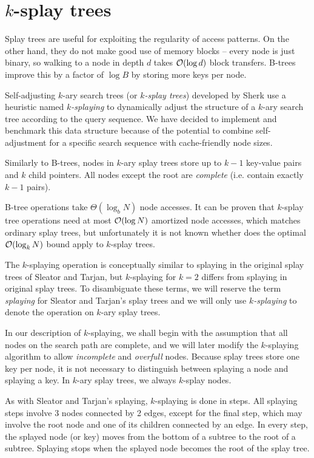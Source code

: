 \chapter{$k$-splay trees}
Splay trees are useful for exploiting the regularity of access patterns.
On the other hand, they do not make good use of memory blocks -- every node
is just binary, so walking to a node in depth $d$ takes $\mathcal{O}(\log d)$ block
transfers. B-trees improve this by a factor of $\log B$ by storing more keys
per node.

Self-adjusting $k$-ary search trees (or \textit{$k$-splay trees}) developed
by Sherk\cite{ksplay-sherk} use a heuristic named \textit{$k$-splaying}
to dynamically adjust the structure of a $k$-ary search tree according to
the query sequence. We have decided to implement and benchmark this data
structure because of the potential to combine self-adjustment for a specific
search sequence with cache-friendly node sizes.

Similarly to B-trees, nodes in $k$-ary splay trees store up to $k-1$ key-value
pairs and $k$ child pointers. All nodes except the root are \textit{complete}
(i.e. contain exactly $k-1$ pairs).

B-tree operations take $\Theta(\log_b N)$ node accesses. It can be proven that
$k$-splay tree operations need at most $\mathcal{O}(\log N)$ amortized node accesses,
which matches ordinary splay trees, but unfortunately it is not known whether
does the optimal $\mathcal{O}(\log_k N)$ bound apply to $k$-splay trees.

The $k$-splaying operation is conceptually similar to splaying in the original
splay trees of Sleator and Tarjan, but $k$-splaying for $k=2$ differs from
splaying in original splay trees. To disambiguate these terms, we will
reserve the term \textit{splaying} for Sleator and Tarjan's splay trees and
we will only use \textit{$k$-splaying} to denote the operation
on $k$-ary splay trees.

In our description of $k$-splaying, we shall begin with the assumption that
all nodes on the search path are complete, and we will later modify
the $k$-splaying algorithm to allow \textit{incomplete} and \textit{overfull}
nodes.
Because splay trees store one key per node, it is not necessary to distinguish
between splaying a node and splaying a key. In $k$-ary splay trees, we always
$k$-splay nodes.

As with Sleator and Tarjan's splaying, $k$-splaying is done in steps.
All splaying steps involve 3 nodes connected by 2 edges, except for the final
step, which may involve the root node and one of its children connected by
an edge. In every step, the splayed node (or key) moves from the bottom
of a subtree to the root of a subtree. Splaying stops when the splayed node
becomes the root of the splay tree.

